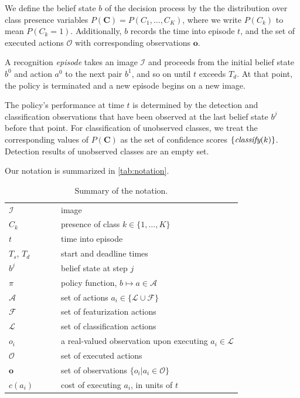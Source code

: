 We define the belief state $b$ of the decision process by the the distribution over class presence variables $P(\mathbf{C}) = P(C_1, \dots, C_K)$, where we write $P(C_k)$ to mean $P(C_k=1)$.
Additionally, $b$ records the time into episode $t$, and the set of executed actions $\mathcal{O}$ with corresponding observations $\mathbf{o}$.

A recognition \emph{episode} takes an image $\mathcal{I}$ and proceeds from the initial belief state $b^0$ and action $a^0$ to the next pair $b^1$, and so on until $t$ exceeds $T_d$.
At that point, the policy is terminated and a new episode begins on a new image.

The policy's performance at time $t$ is determined by the detection and classification observations that have been observed at the last belief state $b^j$ before that point.
For classification of unobserved classes, we treat the corresponding values of $P(\mathbf{C})$ as the set of confidence scores $\{\emph{classify}(k)\}$.
Detection results of unobserved classes are an empty set.


Our notation is summarized in \autoref{tab:notation}.

\begin{table}[h!]
\centering
\caption{Summary of the notation.}
\label{tab:notation}
\begin{tabular}{|l|l|}
  \hline
  $\mathcal{I}$ & image \\
  $C_k$         & presence of class $k \in \{1,\dots,K\}$ \\ 
  $t$           & time into episode \\ 
  $T_s$, $T_d$  & start and deadline times \\ 
  $b^j$         & belief state at step $j$ \\ 
  $\pi$         & policy function, $b \mapsto a \in \mathcal{A}$ \\
  $\mathcal{A}$ & set of actions $a_i \in \{\mathcal{L} \cup \mathcal{F}\}$\\ 
  $\mathcal{F}$ & set of featurization actions \\
  $\mathcal{L}$ & set of classification actions\\
  $o_i$         & a real-valued observation upon executing $a_i \in \mathcal{L}$\\
  $\mathcal{O}$ & set of executed actions\\
  $\mathbf{o}$  & set of observations $\{o_i | a_i \in \mathcal{O}\}$\\
  $c(a_i)$        & cost of executing $a_i$, in units of $t$\\
  \hline
\end{tabular}\end{table}

